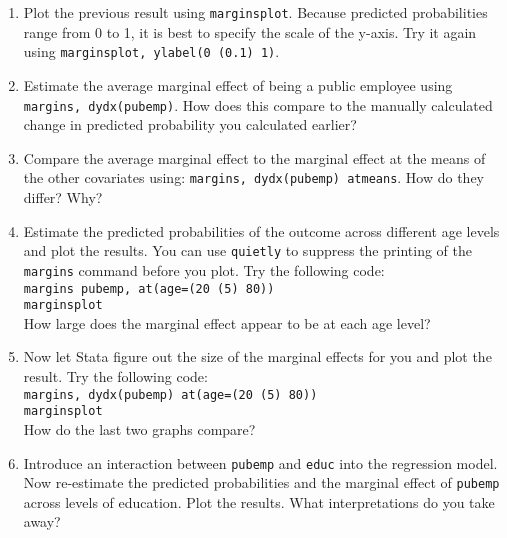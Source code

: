 \documentclass[a4paper,12pt]{article}
\begin{document}
\begin{enumerate}
\item Plot the previous result using \texttt{marginsplot}. Because predicted probabilities range from 0 to 1, it is best to specify the scale of the y-axis. Try it again using \texttt{marginsplot, ylabel(0 (0.1) 1)}.

\item Estimate the average marginal effect of being a public employee using \texttt{margins, dydx(pubemp)}. How does this compare to the manually calculated change in predicted probability you calculated earlier?

\item Compare the average marginal effect to the marginal effect at the means of the other covariates using: \texttt{margins, dydx(pubemp) atmeans}. How do they differ? Why?

\item Estimate the predicted probabilities of the outcome across different age levels and plot the results. You can use \texttt{quietly} to suppress the printing of the \texttt{margins} command before you plot. Try the following code:\\
\texttt{margins pubemp, at(age=(20 (5) 80))\\
marginsplot}\\
How large does the marginal effect appear to be at each age level?

\item Now let Stata figure out the size of the marginal effects for you and plot the result. Try the following code:\\
\texttt{margins, dydx(pubemp) at(age=(20 (5) 80))\\
marginsplot}\\
How do the last two graphs compare?

\item Introduce an interaction between \texttt{pubemp} and \texttt{educ} into the regression model. Now re-estimate the predicted probabilities and the marginal effect of \texttt{pubemp} across levels of education. Plot the results. What interpretations do you take away?





\end{enumerate}
\end{document}
